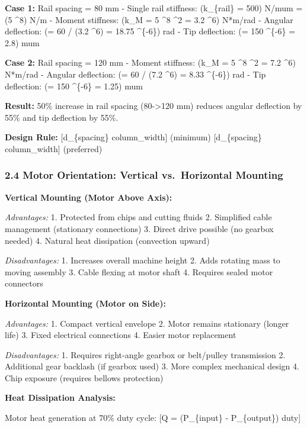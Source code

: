 \documentclass[
]{article}
\begin{document}
\textbf{Case 1:} Rail spacing = 80 mm - Single rail stiffness:
(k\_\{rail\} = 500) N/mum = (5 \^{}8) N/m - Moment stiffness:
(k\_M = 5 \^{}8 \^{}2 = 3.2 \^{}6) N*m/rad
- Angular deflection: (\theta = 60 / (3.2 \^{}6) = 18.75
\^{}\{-6\}) rad - Tip deflection: (\delta = 150 
\^{}\{-6\} = 2.8) mum

\textbf{Case 2:} Rail spacing = 120 mm - Moment stiffness: (k\_M = 5
\^{}8 \^{}2 = 7.2 \^{}6) N*m/rad - Angular
deflection: (\theta = 60 / (7.2 \^{}6) = 8.33
\^{}\{-6\}) rad - Tip deflection: (\delta = 150 
\^{}\{-6\} = 1.25) mum

\textbf{Result:} 50\% increase in rail spacing (80-\textgreater120 mm)
reduces angular deflection by 55\% and tip deflection by 55\%.

\textbf{Design Rule:} {[}d\_\{spacing\}  \times column\_width{]}
(minimum) {[}d\_\{spacing\}  \times column\_width{]} (preferred)

\subsubsection{2.4 Motor Orientation: Vertical vs.~Horizontal
Mounting}\label{motor-orientation-vertical-vs.-horizontal-mounting}

\textbf{Vertical Mounting (Motor Above Axis):}

\emph{Advantages:} 1. Protected from chips and cutting fluids 2.
Simplified cable management (stationary connections) 3. Direct drive
possible (no gearbox needed) 4. Natural heat dissipation (convection
upward)

\emph{Disadvantages:} 1. Increases overall machine height 2. Adds
rotating mass to moving assembly 3. Cable flexing at motor shaft 4.
Requires sealed motor connectors

\textbf{Horizontal Mounting (Motor on Side):}

\emph{Advantages:} 1. Compact vertical envelope 2. Motor remains
stationary (longer life) 3. Fixed electrical connections 4. Easier motor
replacement

\emph{Disadvantages:} 1. Requires right-angle gearbox or belt/pulley
transmission 2. Additional gear backlash (if gearbox used) 3. More
complex mechanical design 4. Chip exposure (requires bellows protection)

\textbf{Heat Dissipation Analysis:}

Motor heat generation at 70\% duty cycle: {[}Q = (P\_\{input\} -
P\_\{output\}) \times duty{]}
\end{document}
